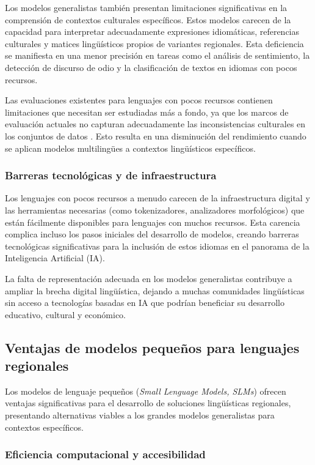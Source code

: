 \documentclass[10pt,twoside]{rcmart} %
\begin{document}
Los modelos generalistas también presentan limitaciones significativas en la comprensión de contextos culturales específicos. Estos modelos carecen de la capacidad para interpretar adecuadamente expresiones idiomáticas, referencias culturales y matices lingüísticos propios de variantes regionales. Esta deficiencia se manifiesta en una menor precisión en tareas como el análisis de sentimiento, la detección de discurso de odio y la clasificación de textos en idiomas con pocos recursos.

Las evaluaciones existentes para lenguajes con pocos recursos contienen limitaciones que necesitan ser estudiadas más a fondo, ya que los marcos de evaluación actuales no capturan adecuadamente las inconsistencias culturales en los conjuntos de datos \cite{gamboa2024filipino}. Esto resulta en una disminución del rendimiento cuando se aplican modelos multilingües a contextos lingüísticos específicos.

\subsubsection{Barreras tecnológicas y de infraestructura}

Los lenguajes con pocos recursos a menudo carecen de la infraestructura digital y las herramientas necesarias (como tokenizadores, analizadores morfológicos) que están fácilmente disponibles para lenguajes con muchos recursos. Esta carencia complica incluso los pasos iniciales del desarrollo de modelos, creando barreras tecnológicas significativas para la inclusión de estos idiomas en el panorama de la Inteligencia Artificial (IA).

La falta de representación adecuada en los modelos generalistas contribuye a ampliar la brecha digital lingüística, dejando a muchas comunidades lingüísticas sin acceso a tecnologías basadas en IA que podrían beneficiar su desarrollo educativo, cultural y económico.

\subsection{Ventajas de modelos pequeños para lenguajes regionales}

Los modelos de lenguaje pequeños (\textit{Small Lenguage Models, SLMs}) ofrecen ventajas significativas para el desarrollo de soluciones lingüísticas regionales, presentando alternativas viables a los grandes modelos generalistas para contextos específicos.

\subsubsection{Eficiencia computacional y accesibilidad}
\end{document}
